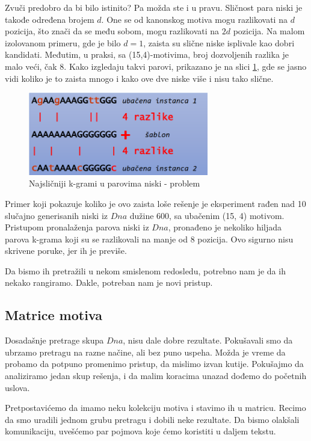Zvuči predobro da bi bilo istinito? Pa možda ste i u pravu. 
Sličnost para niski je takođe određena brojem $d$. One se od kanonskog motiva mogu razlikovati na $d$ pozicija, što znači da se među sobom, mogu razlikovati na $2d$ pozicija.
Na malom izolovanom primeru, gde je bilo $d = 1$, zaista su slične niske isplivale kao dobri kandidati. Međutim, u praksi, sa (15,4)-motivima, broj dozvoljenih razlika je malo veći, čak 8. Kako izgledaju takvi parovi, prikazano je na slici \ref{slika: kgrami problem}, gde se jasno vidi koliko je to zaista mnogo i kako ove dve niske više i nisu tako slične.

\begin{figure}[h]
\centering
\includegraphics[width=0.7\textwidth]{poglavlja/2/slike/26.PNG}
\caption{Najsličniji k-grami u parovima niski - problem}
\label{slika: kgrami problem}
\end{figure}


Primer koji pokazuje koliko je ovo zaista loše rešenje je eksperiment rađen nad 10 slučajno generisanih niski iz $Dna$ dužine 600, sa ubačenim (15, 4) motivom. Pristupom pronalaženja parova niski iz $Dna$, pronađeno je nekoliko hiljada parova k-grama koji su se razlikovali na manje od 8 pozicija. Ovo sigurno nisu skrivene poruke, jer ih je previše. 

Da bismo ih pretražili u nekom smislenom redosledu, potrebno nam je da ih nekako rangiramo. Dakle, potreban nam je novi pristup.


\subsection{Matrice motiva}


Dosadašnje pretrage skupa $Dna$, nisu dale dobre rezultate. Pokušavali smo da ubrzamo pretragu na razne načine, ali bez puno uspeha. Možda je vreme da probamo da potpuno promenimo pristup, da mislimo izvan kutije. Pokušajmo da analiziramo jedan skup rešenja, i da malim koracima unazad dođemo do početnih uslova.

Pretpostavićemo da imamo neku kolekciju motiva i stavimo ih u matricu. Recimo da smo uradili jednom grubu pretragu i dobili neke rezultate. Da bismo olakšali komunikaciju, uvešćemo par pojmova koje ćemo koristiti u daljem tekstu.

